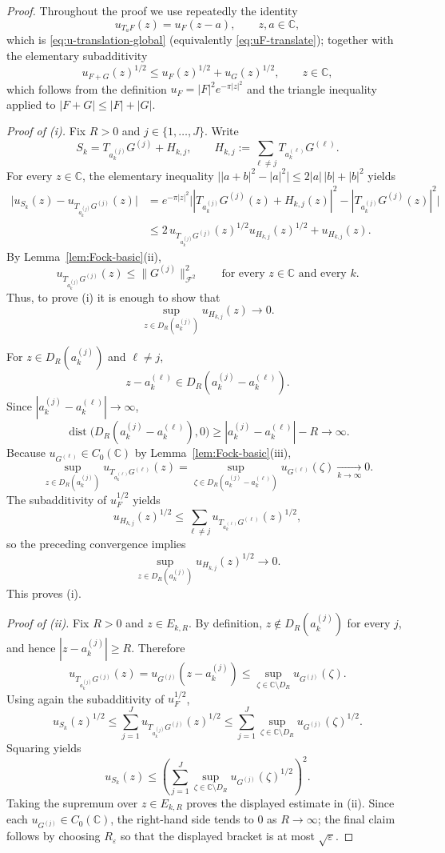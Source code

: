 \documentclass[a4paper,11pt,reqno]{amsart}
\numberwithin{equation}{section}
\theoremstyle{plain} %
\theoremstyle{definition} %
\theoremstyle{remark}
\newcommand{\C}{\mathbb{C}}
\begin{document}
\begin{proof}
Throughout the proof we use repeatedly the identity
\[
u_{T_a F}(z)=u_F(z-a),
\qquad z,a\in \C,
\]
which is \eqref{eq:u-translation-global} (equivalently
\eqref{eq:uF-translate}); together with the elementary subadditivity
\[
u_{F+G}(z)^{1/2}\le u_F(z)^{1/2}+u_G(z)^{1/2},
\qquad z\in\C,
\]
which follows from the definition \(u_F=|F|^2 e^{-\pi |z|^2}\) and the
triangle inequality applied to \(|F+G|\le |F|+|G|\).

\medskip
\noindent\emph{Proof of (i).}
Fix \(R>0\) and \(j\in\{1,\dots,J\}\). Write
\[
S_k=T_{a_k^{(j)}}G^{(j)}+H_{k,j},
\qquad
H_{k,j}:=\sum_{\ell\neq j} T_{a_k^{(\ell)}}G^{(\ell)}.
\]
For every \(z\in \C\), the elementary inequality
\(\big||a+b|^2-|a|^2\big|\le 2|a|\,|b|+|b|^2\) yields
\begin{align*}
\big|u_{S_k}(z)-u_{T_{a_k^{(j)}}G^{(j)}}(z)\big|
&=
e^{-\pi |z|^2}
\big||T_{a_k^{(j)}}G^{(j)}(z)+H_{k,j}(z)|^2
-|T_{a_k^{(j)}}G^{(j)}(z)|^2\big| \\
&\le
2\,u_{T_{a_k^{(j)}}G^{(j)}}(z)^{1/2}u_{H_{k,j}}(z)^{1/2}
+u_{H_{k,j}}(z).
\end{align*}
By Lemma~\ref{lem:Fock-basic}(ii),
\[
u_{T_{a_k^{(j)}}G^{(j)}}(z)\le \|G^{(j)}\|_{\mathcal F^2}^2
\qquad \text{for every }z\in\C\text{ and every }k.
\]
Thus, to prove (i) it is enough to show that
\[
\sup_{z\in D_R(a_k^{(j)})} u_{H_{k,j}}(z)\to 0.
\]

For \(z\in D_R(a_k^{(j)})\) and \(\ell\neq j\),
\[
z-a_k^{(\ell)}\in D_R(a_k^{(j)}-a_k^{(\ell)}).
\]
Since \(|a_k^{(j)}-a_k^{(\ell)}|\to\infty\),
\[
\operatorname{dist}\big(D_R(a_k^{(j)}-a_k^{(\ell)}),0\big)
\ge |a_k^{(j)}-a_k^{(\ell)}|-R\to\infty.
\]
Because \(u_{G^{(\ell)}}\in C_0(\C)\) by Lemma~\ref{lem:Fock-basic}(iii),
\[
\sup_{z\in D_R(a_k^{(j)})} u_{T_{a_k^{(\ell)}}G^{(\ell)}}(z)
=
\sup_{\zeta\in D_R(a_k^{(j)}-a_k^{(\ell)})} u_{G^{(\ell)}}(\zeta)
\xrightarrow[k\to\infty]{} 0.
\]
The subadditivity of \(u_F^{1/2}\) yields
\[
u_{H_{k,j}}(z)^{1/2}
\le
\sum_{\ell\neq j} u_{T_{a_k^{(\ell)}}G^{(\ell)}}(z)^{1/2},
\]
so the preceding convergence implies
\[
\sup_{z\in D_R(a_k^{(j)})} u_{H_{k,j}}(z)^{1/2}\to 0.
\]
This proves (i).

\medskip
\noindent\emph{Proof of (ii).}
Fix \(R>0\) and \(z\in E_{k,R}\). By definition, \(z\notin D_R(a_k^{(j)})\)
for every \(j\), and hence \(|z-a_k^{(j)}|\ge R\). Therefore
\[
u_{T_{a_k^{(j)}}G^{(j)}}(z)
=
u_{G^{(j)}}(z-a_k^{(j)})
\le
\sup_{\zeta\in \C\setminus D_R}u_{G^{(j)}}(\zeta).
\]
Using again the subadditivity of \(u_F^{1/2}\),
\[
u_{S_k}(z)^{1/2}
\le
\sum_{j=1}^J u_{T_{a_k^{(j)}}G^{(j)}}(z)^{1/2}
\le
\sum_{j=1}^J \sup_{\zeta\in \C\setminus D_R}u_{G^{(j)}}(\zeta)^{1/2}.
\]
Squaring yields
\[
u_{S_k}(z)
\le
\left(
\sum_{j=1}^J \sup_{\zeta\in \C\setminus D_R}u_{G^{(j)}}(\zeta)^{1/2}
\right)^2.
\]
Taking the supremum over \(z\in E_{k,R}\) proves the displayed estimate in
(ii). Since each \(u_{G^{(j)}}\in C_0(\C)\), the right-hand side tends to
\(0\) as \(R\to\infty\); the final claim follows by choosing
\(R_\varepsilon\) so that the displayed bracket is at most
\(\sqrt{\varepsilon}\).
\end{proof}
\end{document}
